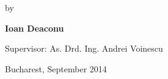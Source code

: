 \vfill
\begin{center}
    \Large
    by
\end{center}

\vfill
\begin{center}
    \huge\bfseries
    Ioan Deaconu
\end{center}

\vfill\vfill\vfill
\begin{center}
	\Large
	Supervisor: As. Drd. Ing. Andrei Voinescu
\end{center}

\vfill
\par\vspace*{15mm}
\begin{center}
\large
    Bucharest, September 2014
\end{center}

\cleardoublepage

\pagestyle{headings}
\tableofcontents






